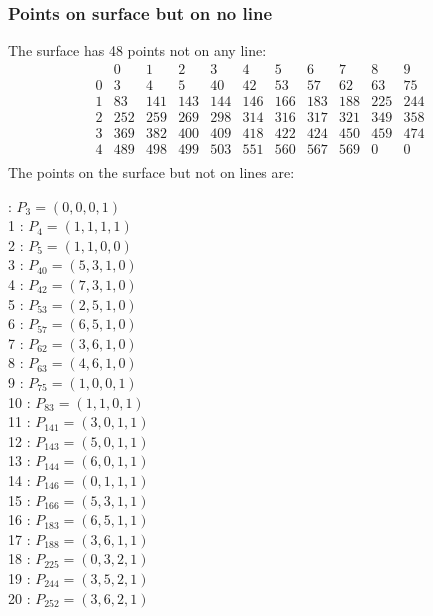 \documentclass{article}
\begin{document}
{\subsubsection*{Points on surface but on no line}
The surface has 48 points not on any line:\\
$$
\begin{array}{r|*{10}{r}}
 & 0 & 1 & 2 & 3 & 4 & 5 & 6 & 7 & 8 & 9\\
\hline
0 & 3 & 4 & 5 & 40 & 42 & 53 & 57 & 62 & 63 & 75\\
1 & 83 & 141 & 143 & 144 & 146 & 166 & 183 & 188 & 225 & 244\\
2 & 252 & 259 & 269 & 298 & 314 & 316 & 317 & 321 & 349 & 358\\
3 & 369 & 382 & 400 & 409 & 418 & 422 & 424 & 450 & 459 & 474\\
4 & 489 & 498 & 499 & 503 & 551 & 560 & 567 & 569 & 0 & 0\\
\end{array}
$$
The points on the surface but not on lines are:\\
\begin{multicols}{2}
 : $P_{3}=( 0, 0, 0, 1 )$\\
1 : $P_{4}=( 1, 1, 1, 1 )$\\
2 : $P_{5}=( 1, 1, 0, 0 )$\\
3 : $P_{40}=( 5, 3, 1, 0 )$\\
4 : $P_{42}=( 7, 3, 1, 0 )$\\
5 : $P_{53}=( 2, 5, 1, 0 )$\\
6 : $P_{57}=( 6, 5, 1, 0 )$\\
7 : $P_{62}=( 3, 6, 1, 0 )$\\
8 : $P_{63}=( 4, 6, 1, 0 )$\\
9 : $P_{75}=( 1, 0, 0, 1 )$\\
10 : $P_{83}=( 1, 1, 0, 1 )$\\
11 : $P_{141}=( 3, 0, 1, 1 )$\\
12 : $P_{143}=( 5, 0, 1, 1 )$\\
13 : $P_{144}=( 6, 0, 1, 1 )$\\
14 : $P_{146}=( 0, 1, 1, 1 )$\\
15 : $P_{166}=( 5, 3, 1, 1 )$\\
16 : $P_{183}=( 6, 5, 1, 1 )$\\
17 : $P_{188}=( 3, 6, 1, 1 )$\\
18 : $P_{225}=( 0, 3, 2, 1 )$\\
19 : $P_{244}=( 3, 5, 2, 1 )$\\
20 : $P_{252}=( 3, 6, 2, 1 )$\\

\end{multicols}}
\end{document}
